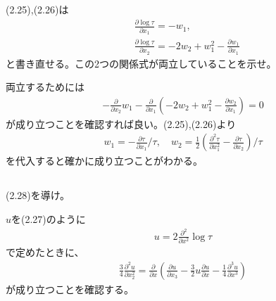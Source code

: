 \documentclass{jsarticle}
\begin{document}
\subsection{}
\begin{shaded}
(2.25),(2.26)は
\begin{align*}
&\frac{\partial \log\tau}{\partial x_{1}}=-w_{1},\\
&\frac{\partial \log\tau}{\partial x_{2}}=-2w_{2}+w_{1}^{2}-\frac{\partial w_{1}}{\partial x_{1}}
\end{align*}
と書き直せる。この2つの関係式が両立していることを示せ。
\end{shaded}
両立するためには
\begin{align}
-\frac{\partial}{\partial x_{2}}w_{1}-\frac{\partial}{\partial x_{1}}\left(-2w_{2}+w_{1}^{2}-\frac{\partial w_{2}}{\partial x_{1}}\right)=0
\end{align}
が成り立つことを確認すれば良い。(2.25),(2.26)より
\begin{align*}
w_{1}=-\frac{\partial \tau}{\partial x_{1}}/\tau,\quad
w_{2}=\frac{1}{2}\left(\frac{\partial^{2}\tau}{\partial x_{1}^{2}}-\frac{\partial \tau}{\partial x_{2}}\right)/\tau
\end{align*}
を代入すると確かに成り立つことがわかる。

\subsection{}
\begin{shaded}
(2.28)を導け。
\end{shaded}
$u$を(2.27)のように
\begin{align}
u=2\frac{\partial^{2}}{\partial x^{2}}\log\tau
\end{align}
で定めたときに、
\begin{align}
\frac{3}{4}\frac{\partial^{2}u}{\partial x_{2}^{2}}=
\frac{\partial}{\partial x}\left(\frac{\partial u}{\partial x_{3}}-\frac{3}{2}u\frac{\partial u}{\partial x}-\frac{1}{4}\frac{\partial^{3}u}{\partial x^{3}}\right)
\end{align}
が成り立つことを確認する。


\appendix
\end{document}
